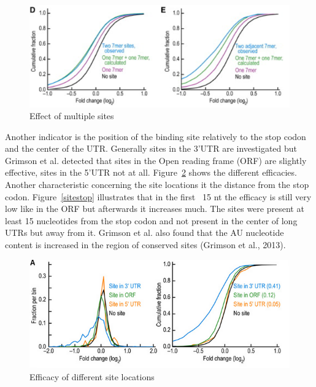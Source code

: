 \documentclass[12pt]{article}
\begin{document}
\begin{figure}
\centering
\includegraphics[scale=0.8]{results/sites_distance.PNG}
\caption{Effect of multiple sites}
\label{sitedistance}
\end{figure}

Another indicator is the position of the binding site relatively to the stop codon and the center of the UTR. Generally sites in the 3'UTR are investigated but Grimson et al. detected that sites in the Open reading frame (ORF) are slightly effective, sites in the 5'UTR not at all. Figure~\ref{siteorf} shows the different efficacies. Another characteristic concerning the site locations it the distance from the stop codon. Figure~\ref{sitestop} illustrates that in the first ~15 nt the efficacy is still very low like in the ORF but afterwards it increases much. 
The sites were present at least 15 nucleotides from the stop codon and not present in the center of long UTRs but away from it. Grimson et al. also found that the AU nucleotide content is increased in the region of conserved sites (Grimson et al., 2013).


\begin{figure}
\centering
\includegraphics[scale=0.8]{results/sites_orf.PNG}
\caption{Efficacy of different site locations}
\label{siteorf}
\end{figure}
\end{document}
